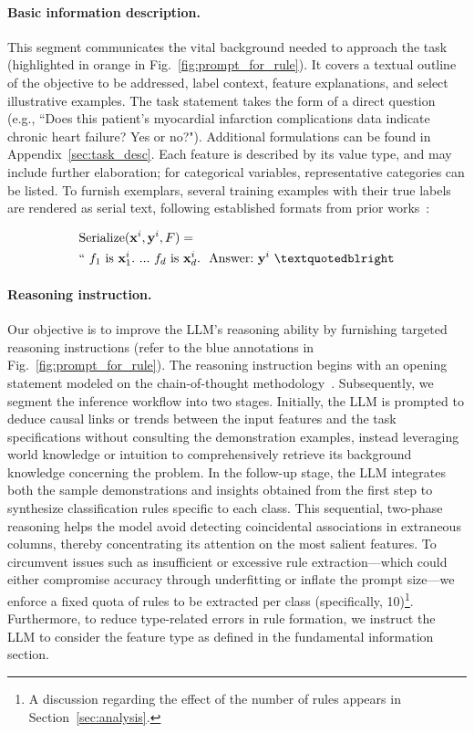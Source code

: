 \vspace*{-0.12in}
\paragraph{Basic information description.} This segment communicates the vital background needed to approach the task (highlighted in orange in Fig.~\ref{fig:prompt_for_rule}). It covers a textual outline of the objective to be addressed, label context, feature explanations, and select illustrative examples. The task statement takes the form of a direct question (e.g., ``Does this patient's myocardial infarction complications data indicate chronic heart failure? Yes or no?"). Additional formulations can be found in Appendix~\ref{sec:task_desc}. Each feature is described by its value type, and may include further elaboration; for categorical variables, representative categories can be listed. To furnish exemplars, several training examples with their true labels are rendered as serial text, following established formats from prior works~\cite{dinh2022lift,hegselmann2023tabllm}:

\begin{align}
&\text{Serialize}(\mathbf{x}^i,\mathbf{y}^i, F) = \nonumber \\ 
&``\ f_1\ \text{is}\ \mathbf{x}^i_1.\ ... \ f_d\  \text{is}\  \mathbf{x}^i_d.\ \ \text{Answer:}\  \mathbf{y}^i\ ”
\end{align}

\vspace*{-0.12in}
\paragraph{Reasoning instruction.} Our objective is to improve the LLM's reasoning ability by furnishing targeted reasoning instructions (refer to the blue annotations in Fig.~\ref{fig:prompt_for_rule}). The reasoning instruction begins with an opening statement modeled on the chain-of-thought methodology~\cite{wei2022chain}. Subsequently, we segment the inference workflow into two stages. Initially, the LLM is prompted to deduce causal links or trends between the input features and the task specifications without consulting the demonstration examples, instead leveraging world knowledge or intuition to comprehensively retrieve its background knowledge concerning the problem. In the follow-up stage, the LLM integrates both the sample demonstrations and insights obtained from the first step to synthesize classification rules specific to each class. This sequential, two-phase reasoning helps the model avoid detecting coincidental associations in extraneous columns, thereby concentrating its attention on the most salient features. To circumvent issues such as insufficient or excessive rule extraction—which could either compromise accuracy through underfitting or inflate the prompt size—we enforce a fixed quota of rules to be extracted per class (specifically, 10)\footnote{A discussion regarding the effect of the number of rules appears in Section~\ref{sec:analysis}.}. Furthermore, to reduce type-related errors in rule formation, we instruct the LLM to consider the feature type as defined in the fundamental information section.

